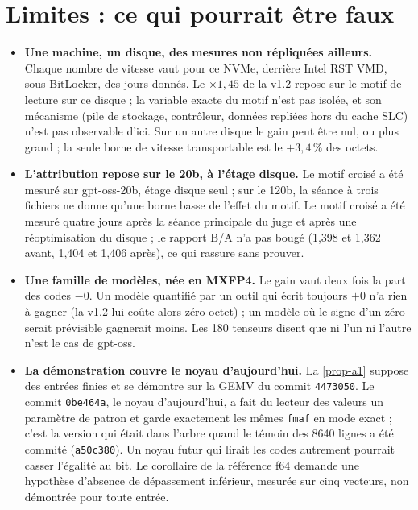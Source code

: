 \documentclass[11pt, a4paper]{article}
\theoremstyle{remark}
\begin{document}
\section{Limites : ce qui pourrait être faux}\label{sec-limites}

\begin{itemize}
\item \textbf{Une machine, un disque, des mesures non répliquées ailleurs.} Chaque nombre de vitesse vaut pour ce NVMe, derrière Intel RST VMD, sous BitLocker, des jours donnés. Le $\times 1{,}45$ de la v1.2 repose sur le motif de lecture sur ce disque ; la variable exacte du motif n'est pas isolée, et son mécanisme (pile de stockage, contrôleur, données repliées hors du cache SLC) n'est pas observable d'ici. Sur un autre disque le gain peut être nul, ou plus grand ; la seule borne de vitesse transportable est le $+3{,}4\,\%$ des octets.
\item \textbf{L'attribution repose sur le 20b, à l'étage disque.} Le motif croisé a été mesuré sur gpt-oss-20b, étage disque seul ; sur le 120b, la séance à trois fichiers ne donne qu'une borne basse de l'effet du motif. Le motif croisé a été mesuré quatre jours après la séance principale du juge et après une réoptimisation du disque ; le rapport B/A n'a pas bougé (1,398 et 1,362 avant, 1,404 et 1,406 après), ce qui rassure sans prouver.
\item \textbf{Une famille de modèles, née en MXFP4.} Le gain vaut deux fois la part des codes $-0$. Un modèle quantifié par un outil qui écrit toujours $+0$ n'a rien à gagner (la v1.2 lui coûte alors zéro octet) ; un modèle où le signe d'un zéro serait prévisible gagnerait moins. Les 180 tenseurs disent que ni l'un ni l'autre n'est le cas de gpt-oss.
\item \textbf{La démonstration couvre le noyau d'aujourd'hui.} La \cref{prop-a1} suppose des entrées finies et se démontre sur la GEMV du commit \texttt{4473050}. Le commit \texttt{0be464a}, le noyau d'aujourd'hui, a fait du lecteur des valeurs un paramètre de patron et garde exactement les mêmes \texttt{fmaf} en mode exact ; c'est la version qui était dans l'arbre quand le témoin des \num{8640} lignes a été commité (\texttt{a50c380}). Un noyau futur qui lirait les codes autrement pourrait casser l'égalité au bit. Le corollaire de la référence f64 demande une hypothèse d'absence de dépassement inférieur, mesurée sur cinq vecteurs, non démontrée pour toute entrée.

\end{itemize}
\end{document}
